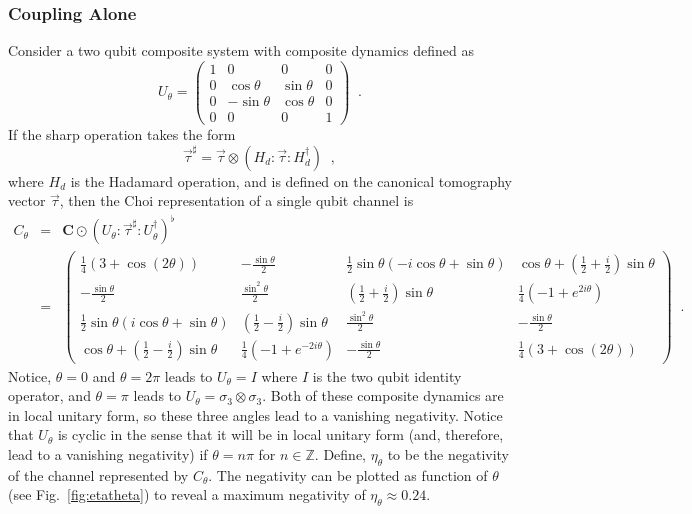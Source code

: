 \subsubsection{Coupling Alone}
\label{sec:couplingalone}
Consider a two qubit composite system with composite dynamics defined as
$$
U_\theta = \begin{pmatrix}
1&0&0&0\\
0&\cos\theta&\sin\theta&0\\
0&-\sin\theta&\cos\theta&0\\
0&0&0&1
\end{pmatrix}\;\;.
$$
If the sharp operation takes the form
$$
\vec{\tau}^\sharp = \vec{\tau}\otimes\left(H_d:\vec{\tau}: H_d^\dagger\right)\;\;,
$$
where $H_d$ is the Hadamard operation, and is defined on the canonical tomography vector $\vec{\tau}$, then the Choi representation of a single qubit channel is
\begin{eqnarray*}
C_\theta &=& \mathbf{C}\odot \left(U_\theta:\vec{\tau}^\sharp :U_\theta^\dagger\right)^\flat\\
&=& \begin{pmatrix}
 \frac{1}{4} (3+\cos\left(2 \theta\right)) & -\frac{\sin\theta}{2} & \frac{1}{2} \sin\theta (-i \cos\theta+\sin\theta) & \cos\theta+\left(\frac{1}{2}+\frac{i}{2}\right) \sin\theta \\
 -\frac{\sin\theta}{2} & \frac{\sin^2\theta}{2} & \left(\frac{1}{2}+\frac{i}{2}\right) \sin\theta & \frac{1}{4} \left(-1+e^{2 i \theta}\right) \\
 \frac{1}{2} \sin\theta (i \cos\theta+\sin\theta) & \left(\frac{1}{2}-\frac{i}{2}\right) \sin\theta & \frac{\sin^2\theta}{2} & -\frac{\sin\theta}{2} \\
 \cos\theta+\left(\frac{1}{2}-\frac{i}{2}\right) \sin\theta & \frac{1}{4} \left(-1+e^{-2 i \theta}\right) & -\frac{\sin\theta}{2} & \frac{1}{4} (3+\cos\left(2 \theta\right))
\end{pmatrix}\;\;.
\end{eqnarray*}
Notice, $\theta=0$ and $\theta=2\pi$ leads to $U_\theta=I$ where $I$ is the two qubit identity operator, and $\theta=\pi$ leads to $U_\theta=\sigma_3\otimes\sigma_3$.  Both of these composite dynamics are in local unitary form, so these three angles lead to a vanishing negativity.  Notice that $U_\theta$ is cyclic in the sense that it will be in local unitary form (and, therefore, lead to a vanishing negativity) if $\theta=n\pi$ for $n\in\mathbb{Z}$.  Define, $\eta_\theta$ to be the negativity of the channel represented by $C_\theta$.  The negativity can be plotted as function of $\theta$ (see Fig.\ \ref{fig:etatheta}) to reveal a maximum negativity of $\eta_\theta\approx 0.24$.  
